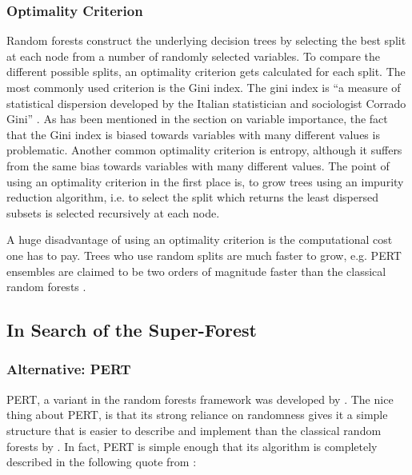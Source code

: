 \documentclass[a4paper,man,12pt,apacite]{apa6} %
\begin{document}
\subsubsection{Optimality Criterion}
Random forests construct the underlying decision trees by selecting the
best split at each node from a number of randomly selected variables.
To compare the different possible splits, an optimality criterion gets
calculated for each split.
The most commonly used criterion is the Gini index.
The gini index is “a measure of statistical dispersion developed by the
Italian statistician and sociologist Corrado Gini” \cite{wpGINI}.
As has been mentioned in the section on variable importance, the fact that
the Gini index is biased towards variables with many different values
is problematic.
Another common optimality criterion is entropy, although it suffers from
the same bias towards variables with many different values.
The point of using an optimality criterion in the first place is,
to grow trees using an impurity reduction algorithm, i.e. to select the split
which returns the least dispersed subsets is selected recursively at each node.

A huge disadvantage of using an optimality criterion is the computational cost
one has to pay.
Trees who use random splits are much faster to grow, e.g. PERT ensembles
are claimed to be two orders of magnitude faster than the classical
random forests \cite{cutler2001pert}.

\subsection{In Search of the Super-Forest}

\subsubsection{Alternative: PERT}
PERT, a variant in the random forests framework was developed
by \cite{cutler2001pert}.
The nice thing about PERT, is that its strong reliance on randomness gives
it a simple structure that is easier to describe and implement than the
classical random forests by \cite{breiman2001random}.
In fact, PERT is simple enough that its algorithm is completely described
in the following quote from \cite{cutler2001pert}:
\end{document}
